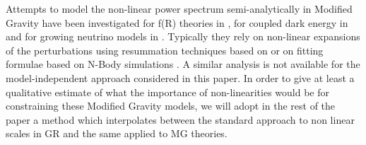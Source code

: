 Attempts to model the non-linear power spectrum semi-analytically in Modified
Gravity have been investigated for f(R) theories in
\cite{zhao_modeling_2014,taruya_regularized_2014},
for coupled dark energy in
\cite{casas_fitting_2015,saracco_non-linear_2010,vollmer_efficient_2014}
and for growing neutrino models in \cite{brouzakis_nonlinear_2011}.
Typically they rely on non-linear expansions of the perturbations
using resummation techniques based on
\cite{pietroni_flowing_2008,taruya_closure_2008}
or on fitting formulae based on N-Body simulations
\cite{casas_fitting_2015,takahashi_revising_2012,bird_massive_2011}.
A similar analysis is not available for the model-independent approach considered
in this paper. 
In order to give at least a qualitative estimate
of what the importance of non-linearities would be for constraining these
Modified Gravity models, we will adopt in the rest of the paper a method 
which interpolates between the standard approach to non linear scales in GR
and the same applied to MG theories.

